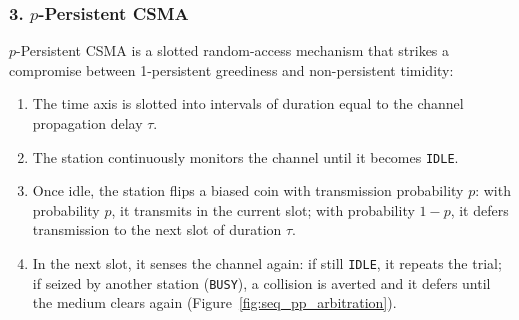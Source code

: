 \documentclass[11pt,a4paper]{article}
\begin{document}
\subsubsection{3. $p$-Persistent CSMA}
$p$-Persistent CSMA is a slotted random-access mechanism that strikes a compromise between 1-persistent greediness and non-persistent timidity:
\begin{enumerate}
    \item The time axis is slotted into intervals of duration equal to the channel propagation delay $\tau$.
    \item The station continuously monitors the channel until it becomes \texttt{IDLE}.
    \item Once idle, the station flips a biased coin with transmission probability $p$: with probability $p$, it transmits in the current slot; with probability $1 - p$, it defers transmission to the next slot of duration $\tau$.
    \item In the next slot, it senses the channel again: if still \texttt{IDLE}, it repeats the trial; if seized by another station (\texttt{BUSY}), a collision is averted and it defers until the medium clears again (Figure~\ref{fig:seq_pp_arbitration}).
\end{enumerate}
\end{document}
